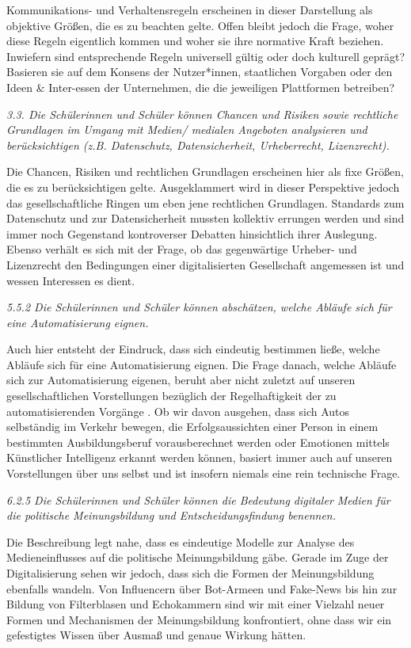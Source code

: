 \documentclass[
  a4paper,
]{book}
\begin{document}
Kommunikations- und Verhaltensregeln erscheinen in dieser Darstellung als objektive Größen, die es zu beachten gelte. Offen bleibt jedoch die Frage, woher diese Regeln eigentlich kommen und woher sie ihre normative Kraft beziehen. Inwiefern sind entsprechende Regeln universell gültig oder doch kulturell geprägt? Basieren sie auf dem Konsens der Nutzer*innen, staatlichen Vorgaben oder den Ideen \& Inter-essen der Unternehmen, die die jeweiligen Plattformen betreiben?

{\emph{3.3. Die Schülerinnen und Schüler können Chancen und Risiken sowie rechtliche Grundlagen im Umgang mit Medien/ medialen Angeboten analysieren und berücksichtigen (z.B. Datenschutz, Datensicherheit, Urheberrecht, Lizenzrecht).}}

Die Chancen, Risiken und rechtlichen Grundlagen erscheinen hier als fixe Größen, die es zu berücksichtigen gelte. Ausgeklammert wird in dieser Perspektive jedoch das gesellschaftliche Ringen um eben jene rechtlichen Grundlagen. Standards zum Datenschutz und zur Datensicherheit mussten kollektiv errungen werden und sind immer noch Gegenstand kontroverser Debatten hinsichtlich ihrer Auslegung. Ebenso verhält es sich mit der Frage, ob das gegenwärtige Urheber- und Lizenzrecht den Bedingungen einer digitalisierten Gesellschaft angemessen ist und wessen Interessen es dient.

{\emph{5.5.2 Die Schülerinnen und Schüler können abschätzen, welche Abläufe sich für eine Automatisierung eignen.}}

Auch hier entsteht der Eindruck, dass sich eindeutig bestimmen ließe, welche Abläufe sich für eine Automatisierung eignen. Die Frage danach, welche Abläufe sich zur Automatisierung eigenen, beruht aber nicht zuletzt auf unseren gesellschaftlichen Vorstellungen bezüglich der Regelhaftigkeit der zu automatisierenden Vorgänge \citep{heintzHerrschaftRegelZur1993}. Ob wir davon ausgehen, dass sich Autos selbständig im Verkehr bewegen, die Erfolgsaussichten einer Person in einem bestimmten Ausbildungsberuf vorausberechnet werden oder Emotionen mittels Künstlicher Intelligenz erkannt werden können, basiert immer auch auf unseren Vorstellungen über uns selbst und ist insofern niemals eine rein technische Frage.

{\emph{6.2.5 Die Schülerinnen und Schüler können die Bedeutung digitaler Medien für die politische Meinungsbildung und Entscheidungsfindung benennen.}}

Die Beschreibung legt nahe, dass es eindeutige Modelle zur Analyse des Medieneinflusses auf die politische Meinungsbildung gäbe. Gerade im Zuge der Digitalisierung sehen wir jedoch, dass sich die Formen der Meinungsbildung ebenfalls wandeln. Von Influencern über Bot-Armeen und Fake-News bis hin zur Bildung von Filterblasen und Echokammern sind wir mit einer Vielzahl neuer Formen und Mechanismen der Meinungsbildung konfrontiert, ohne dass wir ein gefestigtes Wissen über Ausmaß und genaue Wirkung hätten.
\end{document}
